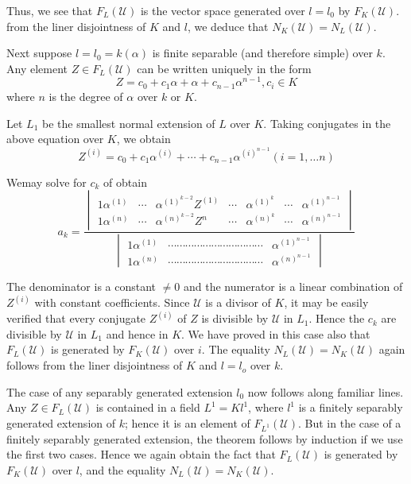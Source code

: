 Thus, we see that $F_L (\mathscr{U})$ is the vector space generated
over $l=l_0$ by $F_K (\mathscr{U})$. from the liner disjointness of
$K$ and $l$, we deduce that $N_K (\mathscr{U}) = N_L (\mathscr{U})$.  

Next suppose $l =l_0 = k (\alpha)$ is finite separable (and therefore
simple) over $k$. Any element $Z \in F_L (\mathscr{U})$ can be
written uniquely in the form 
$$
Z = c_0 + c_1 \alpha +\alpha+ c_{n-1} \alpha^{n-1}, c_i \in K
$$
where $n$ is the degree of $\alpha$ over $k$ or $K$. 

Let $L_1$ be the smallest normal extension of $L$ over $K$. Taking
conjugates in the above equation over $K$, we obtain 
$$
Z^{(i)} = c_0 + c_1 \alpha^{(i)} +\cdots+ c_{n-1} \alpha^{(i)^{n-1}} (i=1 ,\ldots n)
$$

We\pageoriginale may solve for $c_k$ of obtain
$$
a_k=\frac{
  \begin{vmatrix} 
    1 \alpha^{(1)} & \cdots  &
    \alpha^{(1)^{k-2}}Z^{(1)} & \cdots & \alpha^{(1)^{k}} & \cdots&
    \alpha^{(1)^{n-1}} \\ 
    1 \alpha^{(n)} & \cdots  &
    \alpha^{(n)^{k-2}}Z^n & \cdots & \alpha^{(n)^{k}} & \cdots &
    \alpha^{(n)^{n-1}}  
  \end{vmatrix}}
  {\begin{vmatrix} 
      1 \alpha^{(1)} &
      \cdots \cdots \cdots \cdots \cdots \cdots \cdots \cdots \cdots
      \cdots  \cdots  & \alpha^{(1)^{n-1}}\\ 
      1 \alpha^{(n)} & \cdots
      \cdots \cdots\cdots \cdots  \cdots \cdots  \cdots \cdots  \cdots
      \cdots & \alpha^{(n)^{n-1}}  
  \end{vmatrix}} 
$$

The denominator is a constant $\neq 0$ and the numerator is a linear
combination of $Z^{(i)}$ with constant coefficients. Since
$\mathscr{U}$ is a divisor of $K$, it may be easily verified that every
conjugate $Z^{(i)}$ of $Z$ is divisible by $\mathscr{U}$ in
$L_1$. Hence the $c_k$ are divisible by $\mathscr{U}$ in $L_1$ and
hence in $K$. We have proved in this case also that $F_L
(\mathscr{U})$ is generated by $F_K (\mathscr{U})$ over $i$. The
equality $N_L (\mathscr{U}) = N_K (\mathscr{U})$ again follows from
the liner disjointness of $K$ and $l =l_o$ over $k$.  

The case of any separably generated extension $l_0$ now follows along
familiar lines. Any $Z \in F_L (\mathscr{U})$ is contained in
a field $L^1 = Kl^1$, where $l^1$ is a finitely separably generated
extension of $k$; hence it is an element of $F_{L^1} (\mathscr{U})$. But
in the case of a finitely separably generated extension, the theorem
follows by induction if we use the first two cases. Hence we again
obtain the fact that $F_L (\mathscr{U})$ is generated by $F_K
(\mathscr{U})$ over $l$, and the equality $N_L (\mathscr{U}) = N_K
(\mathscr{U})$.  

